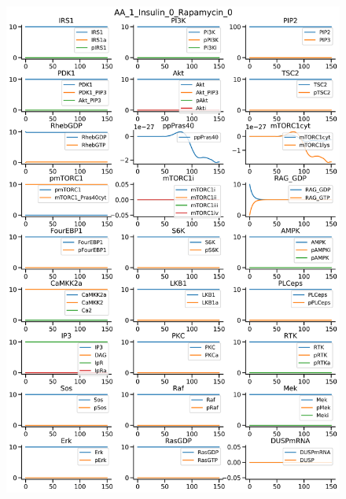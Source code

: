 \documentclass{beamer}
\begin{document}
\begin{frame}
\begin{figure}
\begin{minipage}{0.45\textwidth}
    \end{minipage}
    \begin{minipage}{0.45\textwidth}
        \centering
        \includegraphics[width=\textwidth]{../simulations/ExtendedPI3KModel/validations/AAWithInsulinWithRapamycin/AA_1_Insulin_0_Rapamycin_0-4.png}
    \end{minipage}
\end{figure}
\end{frame}

\end{document}
